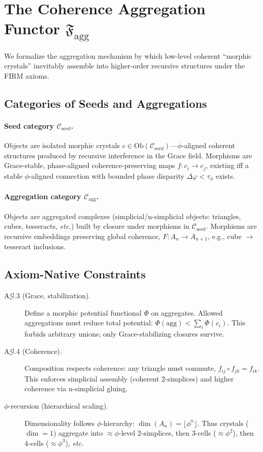 \section{The Coherence Aggregation Functor $\mathfrak{F}_{\mathrm{agg}}$}
\label{sec:coherence_aggregation_functor}

We formalize the aggregation mechanism by which low-level coherent ``morphic crystals''
inevitably assemble into higher-order recursive structures under the FIRM axioms.

\subsection{Categories of Seeds and Aggregations}

\paragraph{Seed category $\mathcal C_{\mathrm{seed}}$.}
Objects are isolated morphic crystals $c\in\mathrm{Ob}(\mathcal C_{\mathrm{seed}})$---$\phi$-aligned coherent
structures produced by recursive interference in the Grace field. Morphisms are
Grace-stable, phase-aligned coherence-preserving maps $f:c_i\to c_j$, existing iff a
stable $\phi$-aligned connection with bounded phase disparity $\Delta\varphi<\tau_\phi$ exists.

\paragraph{Aggregation category $\mathcal C_{\mathrm{agg}}$.}
Objects are aggregated complexes (simplicial/n-simplicial objects: triangles, cubes,
tesseracts, \emph{etc.}) built by closure under morphisms in $\mathcal C_{\mathrm{seed}}$.
Morphisms are recursive embeddings preserving global coherence,
$F: A_n\to A_{n+1}$, e.g., cube $\to$ tesseract inclusions.

\subsection{Axiom-Native Constraints}

\begin{description}
  \item[A$\mathcal G$.3 (Grace, stabilization).] Define a morphic potential functional $\Phi$ on aggregates. Allowed
  aggregations must reduce total potential:
  \(\Phi(\mathrm{agg})<\sum_i\Phi(c_i)\). This forbids arbitrary unions; only Grace-stabilizing closures survive.

  \item[A$\mathcal G$.4 (Coherence).] Composition respects coherence: any triangle must commute,
  $f_{ij}\circ f_{jk}=f_{ik}$. This enforces simplicial assembly (coherent 2-simplices) and
  higher coherence via n-simplicial gluing.

  \item[$\phi$-recursion (hierarchical scaling).] Dimensionality follows $\phi$-hierarchy:
  \(\dim(A_n)=\lfloor \phi^n\rfloor\). Thus crystals ($\dim=1$) aggregate into $\approx\!\phi$-level
  2-simplices, then 3-cells ($\approx\!\phi^2$), then 4-cells ($\approx\!\phi^3$), \emph{etc.}
\end{description}

